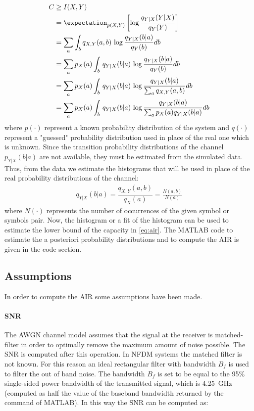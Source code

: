 

\begin{align}\label{eq:air}
	C &\geq I(X,Y) \\
	&=  \expectation_{p(X,Y)}\left[\log \dfrac{q_{Y|X}(Y|X)}{q_{Y}(Y)}\right] \\
	&= \sum_{a} \int_{b}q_{X,Y}(a,b)\,\log \dfrac{q_{Y|X}(b|a)}{q_{Y}(b)}db \\
	&= \sum_{a} p_{X}(a)\int_{b}\,q_{Y|X}(b|a)\,\log \dfrac{q_{Y|X}(b|a)}{q_{Y}(b)} db\\
	&= \sum_{a} p_{X}(a)\int_{b}\,q_{Y|X}(b|a)\,\log \dfrac{q_{Y|X}(b|a)}{\sum_{a} q_{X,Y}(a,b)} db\\
	&= \sum_{a} p_{X}(a)\int_{b}\,q_{Y|X}(b|a)\,\log \dfrac{q_{Y|X}(b|a)}{\sum_{a} p_{X}(a)q_{Y|X}(b|a)} db
\end{align}
where $p(\cdot)$ represent a known probability distribution of the system and $q(\cdot)$ represent a "guessed" probability distribution used in place of the real one which is unknown.
\noindent Since the transition probability distributions of the channel $p_{Y|X}(b|a)$ are not available, they must be estimated from the simulated data. Thus, from the data we estimate the histograms that will be used in place of the
real probability distributions of the channel:
\begin{equation}
\label{eq:hist}
\begin{split}
	q_{Y|X}(b|a) = \dfrac{q_{X,Y}(a,b)}{q_{X}(a)} = \frac{ N(a,b) }{ N(a) }
\end{split}
\end{equation}
where $N(\cdot)$ represents the number of occurrences of the given symbol or symbols pair.
Now, the histogram or a fit of the histogram can be used to estimate the lower bound of the capacity in \eqref{eq:air}. The MATLAB code to estimate the a posteriori probability distributions and to compute the \ac{AIR} is given in the code section.

\subsection{Assumptions}
In order to compute the \ac{AIR} some assumptions have been made.

\paragraph{SNR}
The \ac{AWGN} channel model assumes that the signal at the receiver is matched-filter in order to optimally remove the maximum amount of noise possible. The \ac{SNR} is computed after this operation. In \ac{NFDM} systems the matched filter is not known. For this reason an ideal rectangular filter with bandwidth $B_f$ is used to filter the out of band noise. The bandwidth $B_f$ is set to be equal to the 95\% single-sided power bandwidth of the transmitted signal, which is 4.25~GHz (computed as half the value of the baseband bandwidth returned by the  command of MATLAB). In this way the \ac{SNR} can be computed as:


